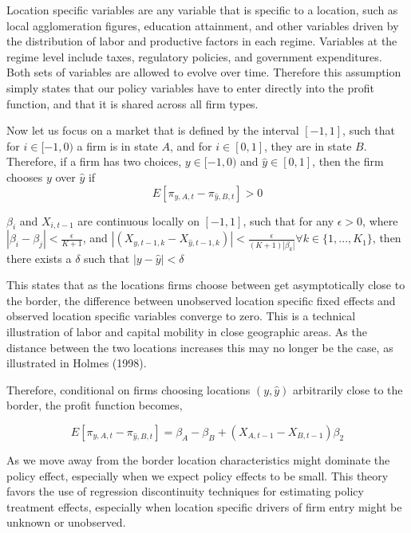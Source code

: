 Location specific variables are any variable that is specific to a location, such as local agglomeration figures, education attainment, and other variables driven by the distribution of labor and productive factors in each regime. Variables at the regime level include taxes, regulatory policies, and government expenditures. Both sets of variables are allowed to evolve over time. Therefore this assumption simply states that our policy variables have to enter directly into the profit function, and that it is shared across all firm types.

Now let us focus on a market that is defined by the interval $[-1,1]$, such that for $i \in [-1,0)$ a firm is in state $A$, and for $i \in [0,1]$, they are in state $B$. Therefore, if a firm has two choices, $y \in [-1,0)$ and $\hat y \in [0,1]$, then the firm chooses $y$ over $\hat y$ if
\begin{equation}\label{diff}
E[\pi_{y,A,t}-\pi_{\hat y,B,t}] > 0
\end{equation}

\begin{assumption}\label{cont}
$\beta_{i}$ and $X_{i,t-1}$ are continuous locally on $[-1,1]$, such that for any $\epsilon > 0$, where  $|\beta_{i}-\beta_{j}| < \frac{\epsilon}{K+1}$, and $|(X_{y,t-1,k}-X_{\hat y,t-1,k})| < \frac{\epsilon}{(K+1)|\beta_{k}|} \forall k \in \{1,...,K_{1}\}$, then there exists a $\delta$ such that $|y - \hat y| < \delta$
\end{assumption}

This states that as the locations firms choose between get asymptotically close to the border, the difference between unobserved location specific fixed effects and observed location specific variables converge to zero. This is a technical illustration of labor and capital mobility in close geographic areas. As the distance between the two locations increases this may no longer be the case, as illustrated in Holmes (1998).

Therefore, conditional on firms choosing locations $(y, \hat y)$ arbitrarily close to the border, the profit function becomes,

\begin{equation}\label{prof}
E[\pi_{y,A,t}-\pi_{\hat y, B, t}] =  \beta_{A}-\beta_{B}+(X_{A,t-1}-X_{B,t-1})\beta_{2}
\end{equation}

As we move away from the border location characteristics might dominate the policy effect, especially when we expect policy effects to be small. This theory favors the use of regression discontinuity techniques for estimating policy treatment effects, especially when location specific drivers of firm entry might be unknown or unobserved.